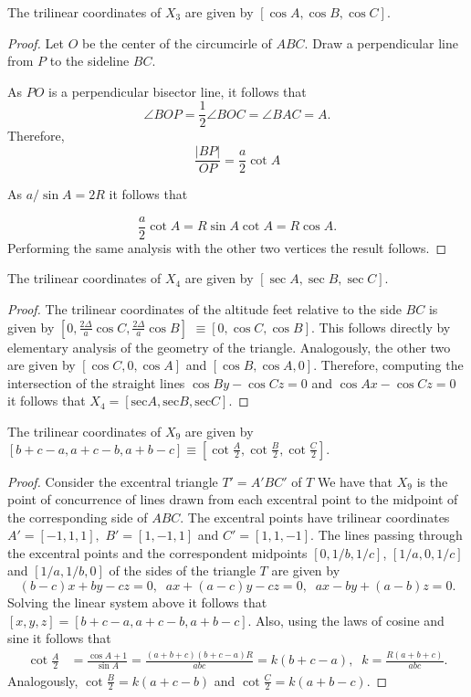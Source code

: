\begin{proposition}
The trilinear coordinates of $X_3$ are given by $[\cos A, \cos B, \cos C].$
\end{proposition}
\begin{proof}
Let $O$ be the center of the circumcirle of $ABC$. Draw a perpendicular line from $P$ to the sideline $BC$.
	
As $PO$ is a perpendicular bisector line, it follows that 
\[ \angle BOP=\frac{1}{2}\angle BOC=\angle BAC=A.\]
Therefore,
\[ \frac{ |BP|}{OP}=\frac{a}{2} \cot A \]

As $a/\sin A=2R$ it follows that

\[\frac{a}{2} \cot A= R\sin A\cot A= R\cos A.\]
Performing the same analysis with the other two vertices the result follows.
\end{proof}


\begin{proposition}
The trilinear coordinates of $X_4$ are given by $[\sec A, \sec B, \sec C].$
\end{proposition}
\begin{proof}
The trilinear coordinates of the altitude feet relative to the  side   $BC$  is given by
$[0,\frac{2\Delta}{a}\cos C,\frac{2\Delta}{a}\cos B]$ $   \equiv  [0, \cos C, \cos B]$.  This follows directly by elementary analysis of the geometry of the triangle.
Analogously,   the other two are given by
$[\cos C, 0, \cos A]$ and $[\cos B,\cos A, 0]$. Therefore, computing the intersection of the straight lines $\cos B y-\cos C z=0$ and $\cos A x-\cos C z=0$ it follows that
$X_4=[\mathrm{sec}{A}, \mathrm{sec}{B},\mathrm{sec}{C}].$
\end{proof}

\begin{proposition}
The trilinear coordinates of $X_9$ are given by $[b+c-a, a+c-b, a+b-c]\equiv [\cot\frac{A}{2}, \cot\frac{B}{2},\cot\frac{C}{2}].$
\end{proposition}
\begin{proof}
Consider the excentral triangle $T'=A'BC'$ of $T$
We have that $X_9$   is the point of concurrence of lines drawn from each excentral point to the midpoint of the corresponding side of $ABC$.
The excentral points have trilinear coordinates $A'=[-1,1,1],$ $B'=[1,-1,1]$ and $C'=[1,1,-1]$. The lines passing through the excentral points and the correspondent midpoints $[0,1/b,1/c]$, $[1/a,0,1/c]$ and $[1/a,1/b,0]$ of the sides of the triangle $T$ are given by
\[ (b - c)x +b y - cz=0, \;\; ax  + ( a - c)y -c z=0,\;\; ax -b y  + (a - b)z=0.\]
Solving the linear system above  it follows that
$[x,y,z]=[b+c-a,a+c-b,a+b-c].$
Also, using the laws of cosine  and sine  it follows that
\begin{align*}
\cot\frac{A}{2}&=\frac{\cos A+1}{\sin A}=\frac{(a + b + c)(b+c-a)R}{abc} =k(b+c-a),\;\; k=\frac{R(a+b+c)}{abc}.
\end{align*}
Analogously, $\cot\frac{B}{2}=k(a+c-b)$ and $\cot\frac{C}{2}=k(a+b-c)$. 
\end{proof}



